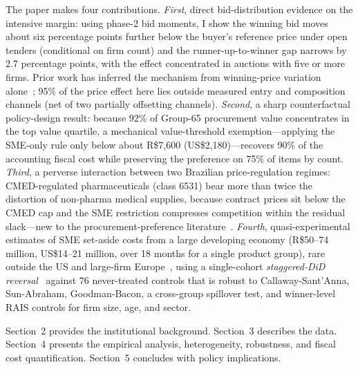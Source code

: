 The paper makes four contributions. \emph{First}, direct bid-distribution evidence on the intensive margin: using phase-2 bid moments, I show the winning bid moves about six percentage points further below the buyer's reference price under open tenders (conditional on firm count) and the runner-up-to-winner gap narrows by 2.7 percentage points, with the effect concentrated in auctions with five or more firms. Prior work has inferred the mechanism from winning-price variation alone~\citep{marion2007, athey2013, krasnokutskaya2011, nakabayashi2013}; 95\% of the price effect here lies outside measured entry and composition channels (net of two partially offsetting channels). \emph{Second}, a sharp counterfactual policy-design result: because 92\% of Group-65 procurement value concentrates in the top value quartile, a mechanical value-threshold exemption---applying the SME-only rule only below about R\$7{,}600 (US\$2{,}180)---recovers 90\% of the accounting fiscal cost while preserving the preference on 75\% of items by count. \emph{Third}, a perverse interaction between two Brazilian price-regulation regimes: CMED-regulated pharmaceuticals (class 6531) bear more than twice the distortion of non-pharma medical supplies, because contract prices sit below the CMED cap and the SME restriction compresses competition within the residual slack---new to the procurement-preference literature~\citep{bosio2022, szucs2024, decarolis2024, colonnelli2022}. \emph{Fourth}, quasi-experimental estimates of SME set-aside costs from a large developing economy (R\$50--74 million, US\$14--21 million, over 18 months for a single product group), rare outside the US and large-firm Europe~\citep{athey2013, krasnokutskaya2011, bandiera2009, best2023}, using a single-cohort \emph{staggered-DiD reversal}~\citep{kim2019, athey2022} against 76 never-treated controls that is robust to Callaway-Sant'Anna, Sun-Abraham, Goodman-Bacon, a cross-group spillover test, and winner-level RAIS controls for firm size, age, and sector.

Section~2 provides the institutional background. Section~3 describes the data. Section~4 presents the empirical analysis, heterogeneity, robustness, and fiscal cost quantification. Section~5 concludes with policy implications.
